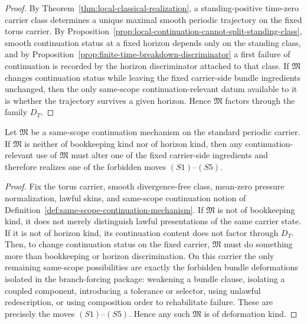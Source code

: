 \begin{proof}
By Theorem~\ref{thm:local-classical-realization}, a standing-positive time-zero carrier class determines
a unique maximal smooth periodic trajectory on the fixed torus carrier. By
Proposition~\ref{prop:local-continuation-cannot-split-standing-class}, smooth continuation status at a
fixed horizon depends only on the standing class, and by Proposition~\ref{prop:finite-time-breakdown-discriminator}
a first failure of continuation is recorded by the horizon discriminator attached to that class. If
$\mathfrak M$ changes continuation status while leaving the fixed carrier-side bundle ingredients
unchanged, then the only same-scope continuation-relevant datum available to it is whether the
trajectory survives a given horizon. Hence $\mathfrak M$ factors through the family $D_T$.
\end{proof}

\begin{manualproposition}
\label{prop:deformation-forcing}
Let $\mathfrak M$ be a same-scope continuation mechanism on the standard periodic carrier.
If $\mathfrak M$ is neither of bookkeeping kind nor of horizon kind, then any continuation-relevant
use of $\mathfrak M$ must alter one of the fixed carrier-side ingredients and therefore realizes one
of the forbidden moves $(S1)$--$(S5)$.
\end{manualproposition}

\begin{proof}
Fix the torus carrier, smooth divergence-free class, mean-zero pressure normalization, lawful skins,
and same-scope continuation notion of Definition~\ref{def:same-scope-continuation-mechanism}. If
$\mathfrak M$ is not of bookkeeping kind, it does not merely distinguish lawful presentations of the
same carrier state. If it is not of horizon kind, its continuation content does not factor through
$D_T$. Then, to change continuation status on the fixed carrier, $\mathfrak M$ must do something more
than bookkeeping or horizon discrimination. On this carrier the only remaining same-scope
possibilities are exactly the forbidden bundle deformations isolated in the branch-forcing package:
weakening a bundle clause, isolating a coupled component, introducing a tolerance or selector, using
unlawful redescription, or using composition order to rehabilitate failure. These are precisely the
moves $(S1)$--$(S5)$. Hence any such $\mathfrak M$ is of deformation kind.
\end{proof}

